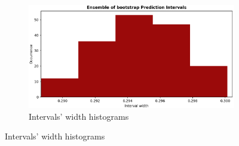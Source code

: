\begin{figure}[ht]
    \centering
    \begin{subfigure}[b]{0.32\textwidth}
        \centering
        \includegraphics[width=1.15\textwidth, height=1.75\textwidth]{Figures/timeseries/without-change-point/width-occurrence-timeseries-problem.png}
        \caption{Intervals' width histograms}
        \label{subfig:app-timeseries-width-histograms}
    \end{subfigure}

\end{figure}
